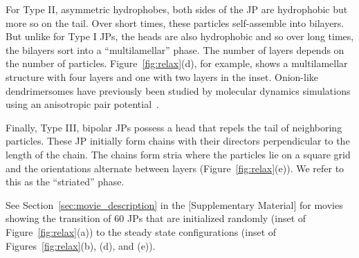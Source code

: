 \documentclass[prb,preprint,showpacs,preprintnumbers,amsmath,amssymb,longbibliography]{revtex4-2}
\begin{document}
For Type II, asymmetric hydrophobes, both sides of the JP are
hydrophobic but more so on the tail. Over short times, these particles
self-assemble into bilayers. But unlike for Type I JPs, the heads are
also hydrophobic and so over long times, the bilayers sort into a
``multilamellar'' phase. The number of layers depends on the number of
particles. Figure~\ref{fig:relax}(d), for example, shows a multilamellar
structure with four layers and one with two layers in the inset.
Onion-like dendrimersomes have previously been studied by molecular
dynamics simulations using an anisotropic pair
potential~\cite{C9NR05885K,HongCacciutoLuijtenGranick2008}.

Finally, Type III, bipolar JPs possess a head that repels the tail of
neighboring particles. These JP initially form chains with their
directors perpendicular to the length of the chain. The chains form
stria where the particles lie on a square grid and the orientations
alternate between layers (Figure~\ref{fig:relax}(e)). We refer to this
as the ``striated'' phase. 

See Section~\ref{sec:movie_description} in the [Supplementary Material]
for movies showing the transition of 60 JPs that are initialized
randomly (inset of Figure~\ref{fig:relax}(a)) to the steady state
configurations (inset of Figures~\ref{fig:relax}(b), (d), and (e)).


\end{document}
